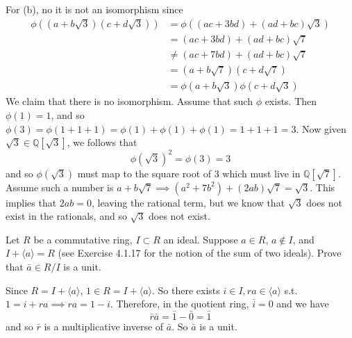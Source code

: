 \begin{solution}
    For (b), no it is not an isomorphism since 
    \begin{align}
      \phi ((a + b \sqrt{3}) (c + d \sqrt{3})) & = \phi ((ac + 3bd) + (ad + bc) \sqrt{3}) \\
                                               & = (ac + 3bd) + (ad + bc) \sqrt{7} \\
                                               & \neq (ac + 7bd) + (ad + bc) \sqrt{7} \\ 
                                               & = (a + b \sqrt{7}) (c + d \sqrt{7}) \\
                                               & = \phi(a + b \sqrt{3}) \phi(c + d  \sqrt{3}) 
    \end{align} 
    We claim that there is no isomorphism. Assume that such $\phi$ exists. Then $\phi(1) = 1$, and so $\phi(3) = \phi(1 + 1 + 1) = \phi(1) + \phi(1) + \phi(1) = 1 + 1 + 1 = 3$. Now given $\sqrt{3} \in \mathbb{Q}[\sqrt{3}]$, we follows that 
    \begin{equation}
      \phi(\sqrt{3})^2 = \phi(3) = 3
    \end{equation}
    and so $\phi(\sqrt{3})$ must map to the square root of $3$ which must live in $\mathbb{Q}[\sqrt{7}]$. Assume such a number is $a + b \sqrt{7} \implies (a^2 + 7b^2) + (2ab) \sqrt{7} = \sqrt{3}$. This implies that $2ab = 0$, leaving the rational term, but we know that $\sqrt{3}$ does not exist in the rationals, and so $\sqrt{3}$ does not exist.  
  \end{solution}

  \begin{exercise}[Shifrin 4.2.12]
    Let $R$ be a commutative ring, $I \subset R$ an ideal. Suppose $a \in R$, $a \notin I$, and $I + \langle a \rangle = R$ (see Exercise 4.1.17 for the notion of the sum of two ideals). Prove that $\bar{a} \in R/I$ is a unit.
  \end{exercise}
  \begin{solution}
    Since $R = I + \langle a \rangle$, $1 \in R = I + \langle a \rangle$. So there exists $i \in I, ra \in \langle a \rangle$ s.t. $1 = i + ra \implies ra = 1 - i$. Therefore, in the quotient ring, $\bar{i} = 0$ and we have 
    \begin{equation}
      \bar{r} \bar{a} = \bar{1} - \bar{0} = \bar{1}
    \end{equation}
    and so $\bar{r}$ is a multiplicative inverse of $\bar{a}$. So $\bar{a}$ is a unit. 
  \end{solution}


